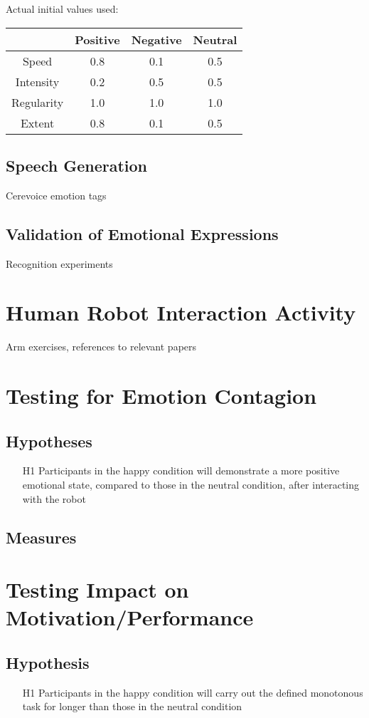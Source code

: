 \documentclass[11pt,a4paper]{report}
\begin{document}
Actual initial values used:

\begin{tabular}{|c|c|c|c|}
\hline & Positive & Negative & Neutral \\ 
\hline Speed & 0.8 & 0.1 & 0.5\\ 
\hline Intensity & 0.2 & 0.5 & 0.5 \\ 
\hline Regularity & 1.0 & 1.0 & 1.0 \\ 
\hline Extent & 0.8 & 0.1 & 0.5\\ 
\hline 
\end{tabular} 

\subsection{Speech Generation}
Cerevoice emotion tags

\subsection{Validation of Emotional Expressions}
Recognition experiments

\section{Human Robot Interaction Activity}
Arm exercises, references to relevant papers

\section{Testing for Emotion Contagion}
\subsection{Hypotheses}
\begin{itemize}
	\item[H1] Participants in the happy condition will demonstrate a more positive emotional state, compared to those in the neutral condition, after interacting with the robot
\end{itemize}
\subsection{Measures}

\section{Testing Impact on Motivation/Performance}
\subsection{Hypothesis}
\begin{itemize}
	\item[H1] Participants in the happy condition will carry out the defined monotonous task for longer than those in the neutral condition
\end{itemize}
\end{document}
